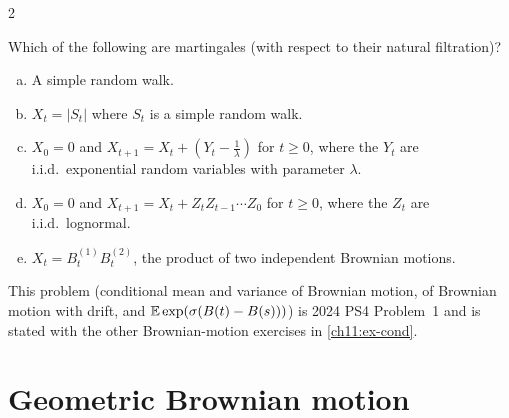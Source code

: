 \begin{paracol}{2}
\begin{exercise}\label{ch17:ex-a1}
Which of the following are martingales (with respect to their natural filtration)?
\begin{enumerate}[(a)]
  \item A simple random walk.
  \item $X_t=|S_t|$ where $S_t$ is a simple random walk.
  \item $X_0=0$ and $X_{t+1}=X_t+(Y_t-\tfrac1\lambda)$ for $t\ge0$, where the $Y_t$ are i.i.d.\ exponential
      random variables with parameter $\lambda$.
  \item $X_0=0$ and $X_{t+1}=X_t+Z_tZ_{t-1}\cdots Z_0$ for $t\ge0$, where the $Z_t$ are i.i.d.\ lognormal.
  \item $X_t=B^{(1)}_tB^{(2)}_t$, the product of two independent Brownian motions.
\end{enumerate}
\end{exercise}

\begin{exercise}[PS8 (2013), Problem A-2]\label{ch17:ex-a2}
This problem (conditional mean and variance of Brownian motion, of Brownian motion with drift, and $\mathbb{E}\exp(\sigma(B(t)-B(s)))$) is 2024 PS4 Problem~1 and is stated with the other Brownian-motion exercises in \cref{ch11:ex-cond}.
\end{exercise}

\section{Geometric Brownian motion}\label{ch17:sec-gbm}


\end{paracol}
